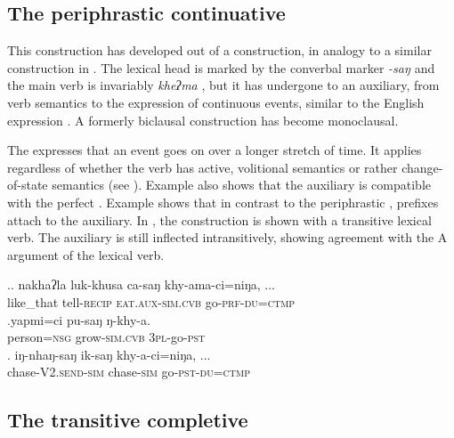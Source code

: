 \subsection{The periphrastic continuative}

This construction has developed out of a  construction, in analogy to a similar construction in . The lexical head is marked by the converbal marker \emph{-saŋ} and the  main verb is invariably \emph{kheʔma} , but it has undergone  to an auxiliary, from  verb semantics to the expression of continuous events, similar to the English expression . A formerly biclausal construction has become monoclausal.

The  expresses that an event goes on over a longer stretch of time. It applies regardless of whether the verb has active, volitional semantics \Next[a] or rather change-of-state semantics (see \Next[b]). Example \Next[a] also shows that the auxiliary is compatible  with the perfect . Example \Next[b] shows that in contrast to the periphrastic , prefixes attach to the auxiliary. In \Next[c], the construction is shown with a transitive lexical verb. The auxiliary is still inflected intransitively, showing agreement with the A argument of the lexical verb.  
 	
\ex.\ag. nakhaʔla   luk-khusa    ca-saŋ           khy-ama-ci=niŋa, ...\\
like\_that tell{\scshape -recip} {\scshape eat.aux-sim.cvb} go{\scshape -prf-du=ctmp}\\
 
\bg.yapmi=ci pu-saŋ ŋ-khy-a.\\
person{\scshape =nsg} grow{\scshape -sim.cvb}  {\scshape 3pl-}go{\scshape -pst}\\
 
 \bg.      iŋ-nhaŋ-saŋ            ik-saŋ         khy-a-ci=niŋa, ...\\
 chase{\scshape -V2.send-sim} chase{\scshape -sim} go{\scshape -pst-du=ctmp}\\
  
 
\subsection{The transitive completive}\label{completive}
 
